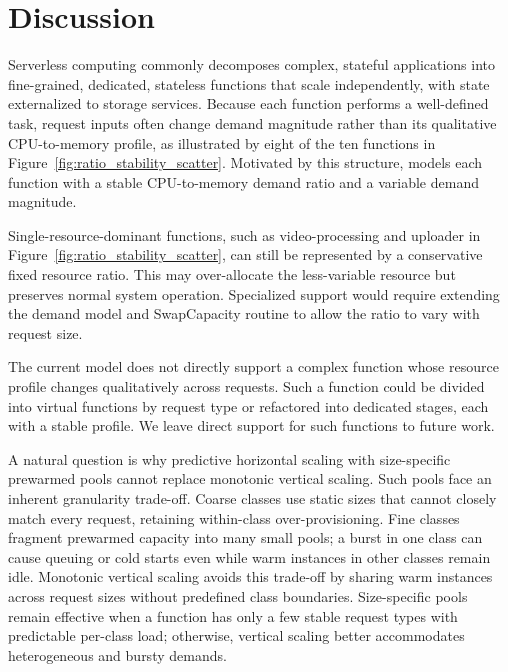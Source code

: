 \vspace{-5pt}
\section{Discussion}
\label{sec:discussion}
\vspace{-5pt}

Serverless computing commonly decomposes complex, stateful applications into
fine-grained, dedicated, stateless functions that scale independently, with state
externalized to storage services. Because each function performs a well-defined
task, request inputs often change demand magnitude rather than its qualitative
CPU-to-memory profile, as illustrated by eight of the ten functions in
Figure~\ref{fig:ratio_stability_scatter}. Motivated by this structure, \sysname
models each function with a stable CPU-to-memory demand ratio and a variable
demand magnitude.

Single-resource-dominant functions, such as video-processing and uploader in
Figure~\ref{fig:ratio_stability_scatter}, can still be represented by a conservative
fixed resource ratio. This may over-allocate the less-variable resource but
preserves normal system operation. Specialized support would require extending
the demand model and SwapCapacity routine to allow the ratio to vary with request
size.

The current model does not directly support a complex function whose resource
profile changes qualitatively across requests. Such a function could be divided
into virtual functions by request type or refactored into dedicated stages, each
with a stable profile. We leave direct support for such functions to future work.

A natural question is why predictive horizontal scaling with size-specific
prewarmed pools cannot replace monotonic vertical scaling. Such pools face an
inherent granularity trade-off. Coarse
classes use static sizes that cannot closely match every request, retaining
within-class over-provisioning. Fine classes fragment prewarmed capacity into
many small pools; a burst in one class can cause queuing or cold starts even
while warm instances in other classes remain idle. Monotonic vertical scaling
avoids this trade-off by sharing warm instances across request sizes without
predefined class boundaries. Size-specific pools remain effective when a function
has only a few stable request types with predictable per-class load; otherwise,
vertical scaling better accommodates heterogeneous and bursty demands.

